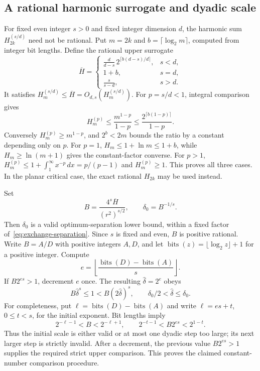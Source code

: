 \documentclass[a4paper,12pt]{article}
\numberwithin{equation}{section}
\begin{document}
\subsection{A rational harmonic surrogate and dyadic scale}\label{sec:epas-dyadic}
For fixed even integer $s>0$ and fixed integer dimension $d$, the harmonic sum $H_{2k}^{(s/d)}$
need not be rational. Put $m=2k$ and $b=\lceil\log_2m\rceil$, computed from integer bit lengths.
Define the rational upper surrogate
\begin{equation}\label{eq:exchange-harmonic-surrogate}
 \overline H=
 \begin{cases}
 \displaystyle\frac{d}{d-s}\,2^{\lceil b(d-s)/d\rceil},&s<d,\\[5pt]
 1+b,&s=d,\\[2pt]
 \displaystyle\frac{s}{s-d},&s>d.
 \end{cases}
\end{equation}
It satisfies $H_m^{(s/d)}\le\overline H=O_{d,s}(H_m^{(s/d)})$. For $p=s/d<1$, integral comparison gives
\[
 H_m^{(p)}\le\frac{m^{1-p}}{1-p}
 \le\frac{2^{\lceil b(1-p)\rceil}}{1-p}.
\]
Conversely $H_m^{(p)}\ge m^{1-p}$, and $2^b<2m$ bounds the ratio by a constant depending only on
$p$. For $p=1$, $H_m\le1+\ln m\le1+b$, while $H_m\ge\ln(m+1)$ gives the constant-factor converse.
For $p>1$, $H_m^{(p)}\le1+\int_1^\infty x^{-p}\,dx=p/(p-1)$ and $H_m^{(p)}\ge1$. This proves all
three cases. In the planar critical case, the exact rational $H_{2k}$ may be used instead.

Set
\[
 B=\frac{4^s\overline H}{(r^2)^{s/2}},
 \qquad \delta_0=B^{-1/s}.
\]
Then $\delta_0$ is a valid optimum-separation lower bound, within a fixed factor
of~\eqref{eq:exchange-separation}. Since $s$ is fixed and even, $B$ is positive rational. Write
$B=A/D$ with positive integers $A,D$, and let $\operatorname{bits}(z)=\lfloor\log_2z\rfloor+1$ for
a positive integer. Compute
\[
 e=\left\lfloor
 \frac{\operatorname{bits}(D)-\operatorname{bits}(A)}s
 \right\rfloor.
\]
If $B2^{es}>1$, decrement $e$ once. The resulting $\widehat\delta=2^e$ obeys
\[
 B\widehat\delta^s\le1<B(2\widehat\delta)^s,
 \qquad \delta_0/2<\widehat\delta\le\delta_0.
\]
For completeness, put $\ell=\operatorname{bits}(D)-\operatorname{bits}(A)$ and write $\ell=es+t$,
$0\le t<s$, for the initial exponent. Bit lengths imply
\[
 2^{-\ell-1}<B<2^{-\ell+1},
 \qquad 2^{-t-1}<B2^{es}<2^{1-t}.
\]
Thus the initial scale is either valid or at most one dyadic step too large; its next larger step
is strictly invalid. After a decrement, the previous value $B2^{es}>1$ supplies the required
strict upper comparison. This proves the claimed constant-number comparison procedure.
\end{document}
